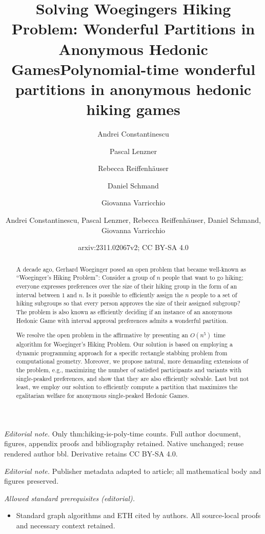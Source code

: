 \documentclass[a4paper]{article}
\title{Solving Woeginger\textquotesingle s Hiking Problem: Wonderful Partitions in Anonymous Hedonic Games}
\author{Andrei Constantinescu \and Pascal Lenzner \and Rebecca Reiffenhäuser \and Daniel Schmand \and Giovanna Varricchio}
\date{}
\title{Polynomial-time wonderful partitions in anonymous hedonic hiking games}
\author{Andrei Constantinescu, Pascal Lenzner, Rebecca Reiffenhäuser, Daniel Schmand, Giovanna Varricchio}
\date{arxiv:2311.02067v2; CC BY-SA 4.0}
\begin{document}
\maketitle
\noindent\textit{Editorial note.} Only thm:hiking-is-poly-time counts. Full author document, figures, appendix proofs and bibliography retained. Native unchanged; reuse rendered author bbl. Derivative retains CC BY-SA 4.0.\par\medskip
\noindent\textit{Editorial note.} Publisher metadata adapted to article; all mathematical body and figures preserved.\par\medskip
\noindent\textit{Allowed standard prerequisites (editorial).}\begin{itemize}
\item Standard graph algorithms and ETH cited by authors. All source-local proofs and necessary context retained.
\end{itemize}\medskip

\maketitle
\begin{abstract}
A decade ago, Gerhard Woeginger posed an open problem that became well-known as ``Woeginger's Hiking Problem'': Consider a group of $n$ people that want to go hiking; everyone expresses preferences over the size of their hiking group in the form of an interval between $1$ and $n$. Is it possible to efficiently assign the $n$ people to a set of hiking subgroups so that every person approves the size of their assigned subgroup? The problem is also known as efficiently deciding if an instance of an anonymous Hedonic Game with interval approval preferences admits a wonderful partition.

We resolve the open problem in the affirmative by presenting an $O(n^5)$ time algorithm for Woeginger's Hiking Problem. Our solution is based on employing a dynamic programming approach for a specific rectangle stabbing problem from computational geo\-metry. Moreover, we propose natural, more demanding extensions of the problem, e.g., maximizing the number of satisfied participants and variants with single-peaked preferences, and show that they are also efficiently solvable.
Last but not least, we employ our solution to efficiently compute a partition that maximizes the egalitarian welfare for anonymous single-peaked Hedonic Games.
\end{abstract}

\end{document}
